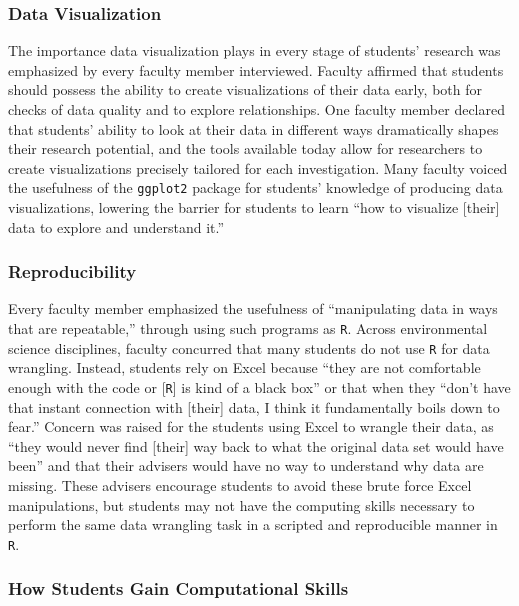 \documentclass[12pt]{article}
\begin{document}
\subsubsection{Data Visualization} 

\quad The importance data visualization plays in every stage of students'
research was emphasized by every faculty member interviewed. Faculty affirmed
that students should possess the ability to create visualizations of their data
early, both for checks of data quality and to explore relationships. One faculty
member declared that students' ability to look at their data in different ways
dramatically shapes their research potential, and the tools available today 
allow for researchers to create visualizations precisely tailored for each
investigation. Many faculty voiced the usefulness of the \texttt{ggplot2} 
\citep{ggplot} package for students' knowledge of producing data visualizations,
lowering the barrier for students to learn ``how to visualize [their] data to
explore and understand it.'' 

\subsubsection{Reproducibility}  

\quad Every faculty member emphasized the usefulness of ``manipulating data in
ways that are repeatable,'' through using such programs as \texttt{R}. Across
environmental science disciplines, faculty concurred that many students do not
use \texttt{R} for data wrangling. Instead, students rely on Excel because 
``they are not comfortable enough with the code or [\texttt{R}] is kind of a 
black box'' or that when they ``don't have that instant connection with [their]
data, I think it fundamentally boils down to fear.'' Concern was raised for the
students using Excel to wrangle their data, as ``they would never find [their]
way back to what the original data set would have been'' and that their advisers
would have no way to understand why data are missing. These advisers encourage
students to avoid these brute force Excel manipulations, but students may not
have the computing skills necessary to perform the same data wrangling task in a
scripted and reproducible manner in \texttt{R}.

\subsubsection{How Students Gain Computational Skills}
\end{document}
